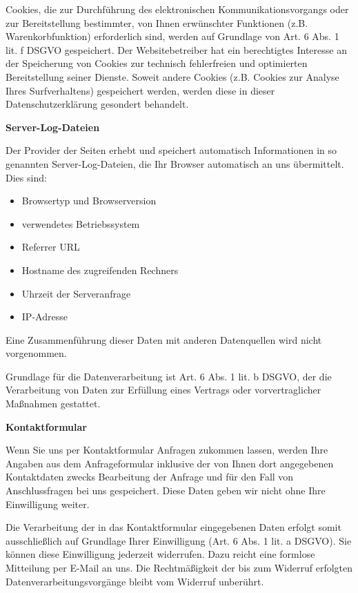 \documentclass[12pt,a4paper]{scrartcl}
\newcommand{\tightlist}{
  \setlength{\itemsep}{0pt}\setlength{\parskip}{0pt}
}
\begin{document}
Cookies, die zur Durchführung des elektronischen Kommunikationsvorgangs
oder zur Bereitstellung bestimmter, von Ihnen erwünschter Funktionen
(z.B. Warenkorbfunktion) erforderlich sind, werden auf Grundlage von
Art. 6 Abs. 1 lit. f DSGVO gespeichert. Der Websitebetreiber hat ein
berechtigtes Interesse an der Speicherung von Cookies zur technisch
fehlerfreien und optimierten Bereitstellung seiner Dienste. Soweit
andere Cookies (z.B. Cookies zur Analyse Ihres Surfverhaltens)
gespeichert werden, werden diese in dieser Datenschutzerklärung
gesondert behandelt.

\textbf{Server-Log-Dateien}

Der Provider der Seiten erhebt und speichert automatisch Informationen
in so genannten Server-Log-Dateien, die Ihr Browser automatisch an uns
übermittelt. Dies sind:

\begin{itemize}
\tightlist
\item
  Browsertyp und Browserversion
\item
  verwendetes Betriebssystem
\item
  Referrer URL
\item
  Hostname des zugreifenden Rechners
\item
  Uhrzeit der Serveranfrage
\item
  IP-Adresse
\end{itemize}

Eine Zusammenführung dieser Daten mit anderen Datenquellen wird nicht
vorgenommen.

Grundlage für die Datenverarbeitung ist Art. 6 Abs. 1 lit. b DSGVO, der
die Verarbeitung von Daten zur Erfüllung eines Vertrags oder
vorvertraglicher Maßnahmen gestattet.

\textbf{Kontaktformular}

Wenn Sie uns per Kontaktformular Anfragen zukommen lassen, werden Ihre
Angaben aus dem Anfrageformular inklusive der von Ihnen dort angegebenen
Kontaktdaten zwecks Bearbeitung der Anfrage und für den Fall von
Anschlussfragen bei uns gespeichert. Diese Daten geben wir nicht ohne
Ihre Einwilligung weiter.

Die Verarbeitung der in das Kontaktformular eingegebenen Daten erfolgt
somit ausschließlich auf Grundlage Ihrer Einwilligung (Art. 6 Abs. 1
lit. a DSGVO). Sie können diese Einwilligung jederzeit widerrufen. Dazu
reicht eine formlose Mitteilung per E-Mail an uns. Die Rechtmäßigkeit
der bis zum Widerruf erfolgten Datenverarbeitungsvorgänge bleibt vom
Widerruf unberührt.
\end{document}
